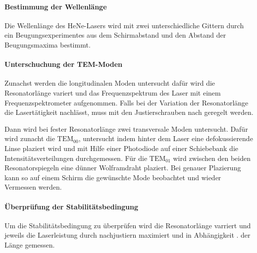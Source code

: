 \paragraph{Bestimmung der Wellenlänge}
Die Wellenlänge des HeNe-Lasers wird mit zwei unterschiedliche
Gittern durch ein Beugungsexperimentes aus dem Schirmabstand
und den Abstand der Beugungsmaxima bestimmt.

\paragraph{Unterschuchung der TEM-Moden}
Zunachst werden die longitudinalen Moden untersucht dafür
wird die Resonatorlänge variert und das Frequenzspektrum des Laser
mit einem Frequenzspektrometer aufgenommen.
Falls bei der Variation der Resonatorlänge die Lasertätigkeit
nachlässt, muss mit den Justierschrauben nach geregelt werden.

Dann wird bei fester Resonatorlänge zwei transversale Moden untersucht.
Dafür wird zunacht die $\text{TEM}_{00}$, untersucht indem hinter dem
Laser eine defokussierende Linse plaziert wird und mit Hilfe einer
Photodiode auf einer Schiebebank die Intensitätsverteilungen
durchgemessen.
Für die $\text{TEM}_{01}$ wird zwischen den beiden Resonatorspiegeln
eine dünner Wolframdraht plaziert. Bei genauer Plazierung kann so auf
einem Schirm die gewünschte Mode beobachtet
und wieder Vermessen werden.


\paragraph{Überprüfung der Stabilitätsbedingung}
Um die Stabilitätsbedingung zu überprüfen
wird die Resonatorlänge varriert und jeweils
die Laserleistung durch nachjustiern maximiert und in Abhängigkeit .
der Länge gemessen.
